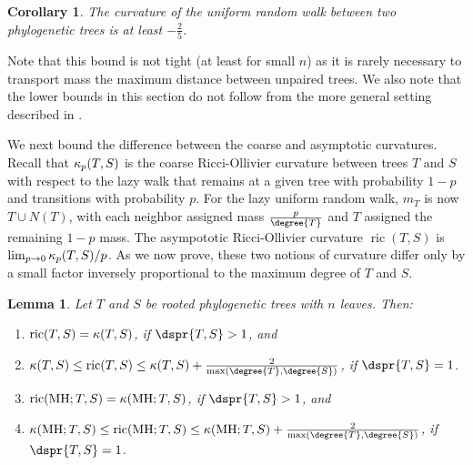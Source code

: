 \documentclass[11pt,onecolumn,conference]{IEEEtran}
\newtheorem{lemma}[theorem]{Lemma}
\newtheorem{corollary}[theorem]{Corollary}
\newcommand{\MH}{\operatorname{MH}}
\newcommand{\curvature}[2][]{%
    \ifthenelse{\equal{#1}{}}%
		{\kappa(#2)}%
		{\kappa_{#1}(#2)}%
}
\newcommand{\ric}[1]{
	\operatorname{ric}(#1)%
}
\begin{document}
\begin{corollary}
	The curvature of the uniform random walk between two phylogenetic trees is at least $-\frac{2}{5}$.
\end{corollary}

Note that this bound is not tight (at least for small $n$) as it is rarely necessary to transport mass the maximum distance between unpaired trees.
We also note that the lower bounds in this section do not follow from the more general setting described in \cite{Jost2013-ce}.

We next bound the difference between the coarse and asymptotic curvatures.
Recall that $\curvature[p]{T,S}$ is the coarse Ricci-Ollivier curvature between trees $T$ and $S$ with respect to the lazy walk that remains at a given tree with probability $1-p$ and transitions with probability $p$.
For the lazy uniform random walk, $m_T$ is now $T \cup N(T)$, with each neighbor assigned mass $\frac{p}{\degree{T}}$ and $T$ assigned the remaining $1 - p$ mass.
The asympototic Ricci-Ollivier curvature $\ric{T,S}$ is $\lim_{p \rightarrow 0} \curvature[p]{T,S} / p$.
As we now prove, these two notions of curvature differ only by a small factor inversely proportional to the maximum degree of $T$ and $S$.

\begin{lemma}
\label{lem:asymptotic}
	Let $T$ and $S$ be rooted phylogenetic trees with $n$ leaves.
	Then:
	\begin{enumerate}
		\item	$\ric{T,S} = \curvature{T,S}$, if $\dspr{T,S} > 1$, and
		\item	$\curvature{T,S} \le \ric{T,S} \le \curvature{T,S} + \frac{2}{\max(\degree{T}, \degree{S})}$, if $\dspr{T,S} = 1$.
		\item	$\ric{\MH; T,S} = \curvature{\MH; T,S}$, if $\dspr{T,S} > 1$, and
		\item	$\curvature{\MH; T,S} \le \ric{\MH; T,S} \le \curvature{\MH; T,S} + \frac{2}{\max(\degree{T}, \degree{S})}$, if $\dspr{T,S} = 1$.
	\end{enumerate}
\end{lemma}
\end{document}
